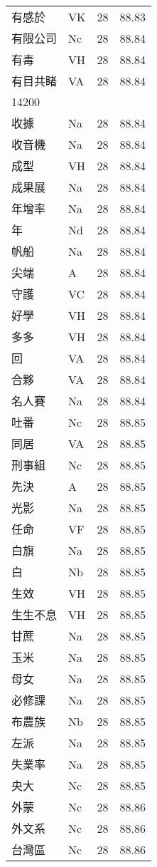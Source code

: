 \documentclass[twocolumn]{book}
\begin{document}
\begin{supertabular}{llrr}
有感於 & VK & 28 &  88.83\\
有限公司 & Nc & 28 &  88.84\\
有毒 & VH & 28 &  88.84\\
有目共睹 & VA & 28 &  88.84\\
14200\\
收據 & Na & 28 &  88.84\\
收音機 & Na & 28 &  88.84\\
成型 & VH & 28 &  88.84\\
成果展 & Na & 28 &  88.84\\
年增率 & Na & 28 &  88.84\\
年 & Nd & 28 &  88.84\\
帆船 & Na & 28 &  88.84\\
尖端 & A & 28 &  88.84\\
守護 & VC & 28 &  88.84\\
好學 & VH & 28 &  88.84\\
多多 & VH & 28 &  88.84\\
回 & VA & 28 &  88.84\\
合夥 & VA & 28 &  88.84\\
名人賽 & Na & 28 &  88.84\\
吐番 & Nc & 28 &  88.85\\
同居 & VA & 28 &  88.85\\
刑事組 & Nc & 28 &  88.85\\
先決 & A & 28 &  88.85\\
光影 & Na & 28 &  88.85\\
任命 & VF & 28 &  88.85\\
白旗 & Na & 28 &  88.85\\
白 & Nb & 28 &  88.85\\
生效 & VH & 28 &  88.85\\
生生不息 & VH & 28 &  88.85\\
甘蔗 & Na & 28 &  88.85\\
玉米 & Na & 28 &  88.85\\
母女 & Na & 28 &  88.85\\
必修課 & Na & 28 &  88.85\\
布農族 & Nb & 28 &  88.85\\
左派 & Na & 28 &  88.85\\
失業率 & Na & 28 &  88.85\\
央大 & Nc & 28 &  88.85\\
外蒙 & Nc & 28 &  88.86\\
外文系 & Nc & 28 &  88.86\\
台灣區 & Nc & 28 &  88.86\\

\end{supertabular}
\end{document}
